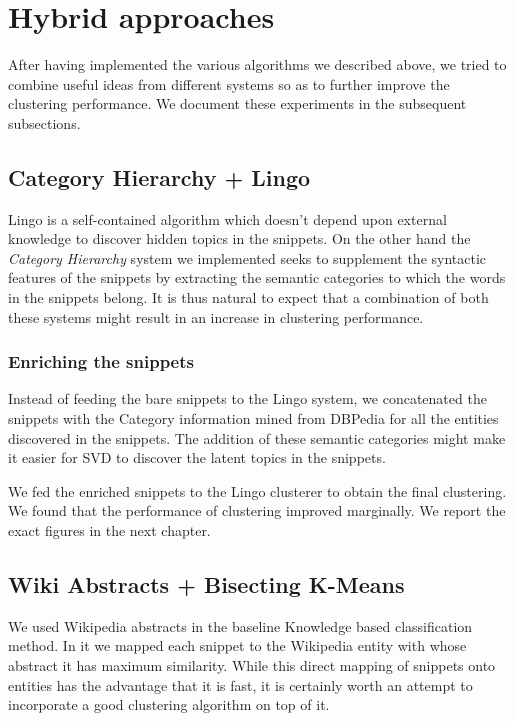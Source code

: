 \documentclass[a4paper,12pt]{report}
\begin{document}
\section{Hybrid approaches}

After having implemented the various algorithms we described above, we
tried to combine useful ideas from different systems so as to further
improve the clustering performance. We document these experiments in
the subsequent subsections.

\subsection{Category Hierarchy + Lingo}

Lingo is a self-contained algorithm which doesn't depend upon external
knowledge to discover hidden topics in the snippets. On the other hand
the {\it Category Hierarchy} system we implemented seeks to supplement
the syntactic features of the snippets by extracting the semantic
categories to which the words in the snippets belong. It is thus
natural to expect that a combination of both these systems might
result in an increase in clustering performance.

\subsubsection{Enriching the snippets}

Instead of feeding the bare snippets to the Lingo system, we
concatenated the snippets with the Category information mined from
DBPedia for all the entities discovered in the snippets. The addition
of these semantic categories might make it easier for SVD to discover
the latent topics in the snippets.

We fed the enriched snippets to the Lingo clusterer to obtain the
final clustering. We found that the performance of clustering
improved marginally. We report the exact figures in the next chapter.


\subsection{Wiki Abstracts + Bisecting K-Means}

We used Wikipedia abstracts in the baseline Knowledge based
classification method. In it we mapped each snippet to the Wikipedia
entity with whose abstract it has maximum similarity. While this direct
mapping of snippets onto entities has the advantage that it is fast,
it is certainly worth an attempt to incorporate a good clustering
algorithm on top of it. 
\end{document}
